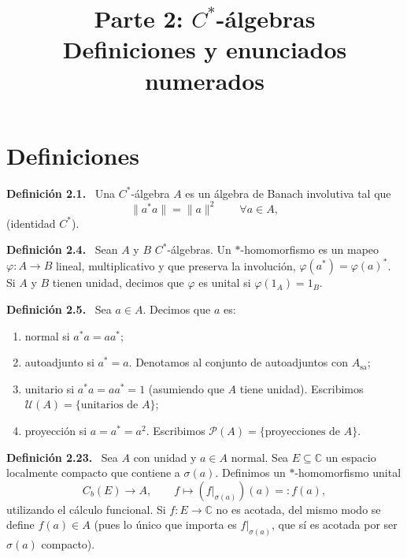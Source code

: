 \documentclass[11pt]{article}
\title{Parte 2: $C^*$-álgebras\\Definiciones y enunciados numerados}
\author{}
\date{}
\newcommand{\Asa}{A_{\mathrm{sa}}}
\newcommand{\U}{\mathcal{U}}
\newcommand{\Pj}{\mathcal{P}}
\newenvironment{definicion}[1]{\par\medskip\noindent\textbf{Definición #1.}\ }{\par\medskip}
\begin{document}
\maketitle

\section*{Definiciones}
\begin{definicion}{2.1}
Una $C^*$-álgebra $A$ es un álgebra de Banach involutiva tal que
\[\lVert a^*a\rVert=\lVert a\rVert^2\qquad\forall a\in A,\]
(identidad $C^*$).
\end{definicion}
\begin{definicion}{2.4}
Sean $A$ y $B$ $C^*$-álgebras. Un $*$-homomorfismo es un mapeo $\varphi:A\to B$ lineal, multiplicativo y que preserva la involución, $\varphi(a^*)=\varphi(a)^*$. Si $A$ y $B$ tienen unidad, decimos que $\varphi$ es unital si $\varphi(1_A)=1_B$.
\end{definicion}
\begin{definicion}{2.5}
Sea $a\in A$. Decimos que $a$ es:
\begin{enumerate}[label=(\roman*),leftmargin=2.2em]
\item normal si $a^*a=aa^*$;
\item autoadjunto si $a^*=a$. Denotamos al conjunto de autoadjuntos con $\Asa$;
\item unitario si $a^*a=aa^*=1$ (asumiendo que $A$ tiene unidad). Escribimos $\U(A)=\{\text{unitarios de }A\}$;
\item proyección si $a=a^*=a^2$. Escribimos $\Pj(A)=\{\text{proyecciones de }A\}$.
\end{enumerate}
\end{definicion}
\begin{definicion}{2.23}
Sea $A$ con unidad y $a\in A$ normal. Sea $E\subseteq\mathbb C$ un espacio localmente compacto que contiene a $\sigma(a)$. Definimos un $*$-homomorfismo unital
\[C_b(E)\to A,\qquad f\mapsto (f|_{\sigma(a)})(a)=:f(a),\]
utilizando el cálculo funcional. Si $f:E\to\mathbb C$ no es acotada, del mismo modo se define $f(a)\in A$ (pues lo único que importa es $f|_{\sigma(a)}$, que sí es acotada por ser $\sigma(a)$ compacto).
\end{definicion}
\end{document}
